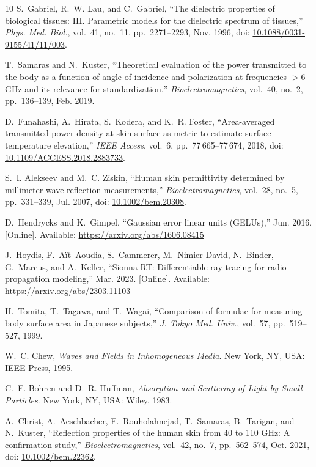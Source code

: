 \documentclass[journal,twocolumn,10pt]{IEEEtran}
\newcommand*{\doi}[1]{\href{https://doi.org/#1}{#1}}
\begin{document}
\begin{thebibliography}{10}
S.~Gabriel, R.~W. Lau, and C.~Gabriel, ``The dielectric properties of
  biological tissues: III. Parametric models for the dielectric spectrum
  of tissues,'' \emph{Phys. Med. Biol.}, vol.~41, no.~11,
  pp.~2271--2293, Nov. 1996, doi: \doi{10.1088/0031-9155/41/11/003}.

T.~Samaras and N.~Kuster, ``Theoretical evaluation of the power
  transmitted to the body as a function of angle of incidence and
  polarization at frequencies ${>}$6\,GHz and its relevance for
  standardization,'' \emph{Bioelectromagnetics}, vol.~40, no.~2,
  pp.~136--139, Feb. 2019.

D.~Funahashi, A.~Hirata, S.~Kodera, and K.~R. Foster, ``Area-averaged
  transmitted power density at skin surface as metric to estimate
  surface temperature elevation,'' \emph{IEEE Access}, vol.~6,
  pp.~77\,665--77\,674, 2018,
  doi: \doi{10.1109/ACCESS.2018.2883733}.

S.~I. Alekseev and M.~C. Ziskin, ``Human skin permittivity determined
  by millimeter wave reflection measurements,''
  \emph{Bioelectromagnetics}, vol.~28, no.~5, pp.~331--339, Jul. 2007,
  doi: \doi{10.1002/bem.20308}.

D.~Hendrycks and K.~Gimpel, ``Gaussian error linear units (GELUs),''
  Jun. 2016. [Online]. Available: \url{https://arxiv.org/abs/1606.08415}

J.~Hoydis, F.~A\"{i}t~Aoudia, S.~Cammerer, M.~Nimier-David, N.~Binder,
  G.~Marcus, and A.~Keller, ``Sionna RT: Differentiable ray tracing for
  radio propagation modeling,'' Mar. 2023. [Online]. Available:
  \url{https://arxiv.org/abs/2303.11103}

H.~Tomita, T.~Tagawa, and T.~Wagai, ``Comparison of formulae for
  measuring body surface area in Japanese subjects,'' \emph{J. Tokyo
  Med. Univ.}, vol.~57, pp.~519--527, 1999.

W.~C. Chew, \emph{Waves and Fields in Inhomogeneous Media}.
  New York, NY, USA: IEEE Press, 1995.

C.~F. Bohren and D.~R. Huffman, \emph{Absorption and Scattering of
  Light by Small Particles}.
  New York, NY, USA: Wiley, 1983.

A.~Christ, A.~Aeschbacher, F.~Rouholahnejad, T.~Samaras, B.~Tarigan,
  and N.~Kuster, ``Reflection properties of the human skin from 40 to
  110 GHz: A confirmation study,'' \emph{Bioelectromagnetics},
  vol.~42, no.~7, pp.~562--574, Oct. 2021,
  doi: \doi{10.1002/bem.22362}.


\end{thebibliography}
\end{document}
